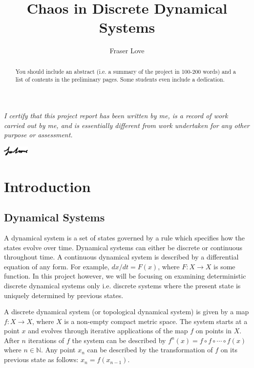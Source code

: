 \documentclass[11pt]{article}
\title{Chaos in Discrete Dynamical Systems}
\author{Fraser Love}
\theoremstyle{definition}
\begin{document}
\maketitle

\noindent\textit{I certify that this project report has been written by me, is a record of work carried out by me, and is essentially different from work undertaken for any other purpose or assessment.}

\vspace{0.1cm}\hspace{13.1cm}\includegraphics[width=1.3cm]{signature}

\begin{abstract}
    You should include an abstract (i.e. a summary of the project in 100-200 words) and a list of contents in the preliminary pages. Some students even include a dedication.
\end{abstract}

\tableofcontents

\section{Introduction}
\subsection{Dynamical Systems}
A dynamical system is a set of states governed by a rule which specifies how the states evolve over time. Dynamical systems can either be discrete or continuous throughout time. A continuous dynamical system is described by a differential equation of any form. For example, $dx/dt = F(x)$, where $F: X \to X$ is some function. In this project however, we will be focusing on examining deterministic discrete dynamical systems only i.e. discrete systems where the present state is uniquely determined by previous states.

A discrete dynamical system (or topological dynamical system) is given by a map $f : X \to X$, where $X$ is a non-empty compact metric space. The system starts at a point $x$ and evolves through iterative applications of the map $f$ on points in $X$. After $n$ iterations of $f$ the system can be described by $f^n(x) = f \circ f \circ \cdots \circ f(x)$ where $n \in \mathbb{N}$. Any point $x_n$ can be described by the transformation of $f$ on its previous state as follows: $x_n = f(x_{n-1})$. 
\end{document}
